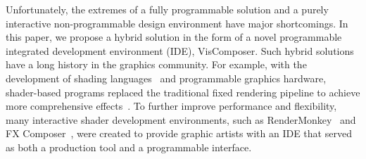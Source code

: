 Unfortunately, the extremes of a fully programmable solution and a purely interactive non-programmable design environment have major shortcomings. In this paper, we propose a hybrid solution in the form of a novel programmable integrated development environment (IDE), VisComposer.  Such hybrid solutions have a long history in the graphics community.  For example, with the development of shading languages~\cite{RenderMan,OpenGLSL} and programmable graphics hardware, shader-based programs replaced the traditional fixed rendering pipeline to achieve more comprehensive effects~\cite{RTVG,Rieder:2011:CGF}.  To further improve performance and flexibility, many interactive shader development environments, such as RenderMonkey~\cite{RenderMonkey} and FX Composer~\cite{FXComposer}, were created to provide graphic artists with an IDE that served as both a production tool and a programmable interface.

